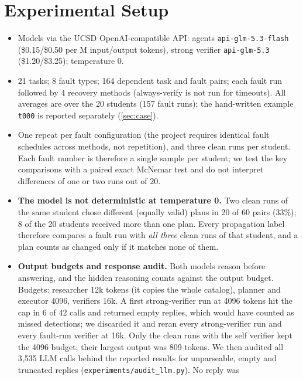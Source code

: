 \documentclass[11pt]{article}
\newcommand{\code}[1]{\texttt{\small #1}}
\begin{document}
\section{Experimental Setup}
\label{sec:setup}
\begin{itemize}[leftmargin=*,itemsep=1pt]
  \item Models via the UCSD OpenAI-compatible API: agents
        \code{api-glm-5.3-flash} (\$0.15/\$0.50 per M input/output tokens),
        strong verifier \code{api-glm-5.3} (\$1.20/\$3.25); temperature 0.
  \item 21 tasks; 8 fault types; 164 dependent task and fault pairs; each fault
        run followed by 4 recovery methods (always-verify is not run for
        timeouts). All averages are over the 20 students (157 fault runs);
        the hand-written example \code{t000} is reported separately
        (\cref{sec:case}).
  \item One repeat per fault configuration (the project requires identical
        fault schedules across methods, not repetition), and three clean runs
        per student. Each fault number is therefore a single sample per
        student; we test the key comparisons with a paired exact McNemar test
        and do not interpret differences of one or two runs out of 20.
  \item \textbf{The model is not deterministic at temperature 0.} Two clean
        runs of the same student chose different (equally valid) plans in 20
        of 60 pairs (33\%); 8 of the 20 students received more than one plan.
        Every propagation label therefore compares a fault run with
        \emph{all three} clean runs of that student, and a plan counts as
        changed only if it matches none of them.
  \item \textbf{Output budgets and response audit.} Both models reason
        before answering, and the hidden reasoning counts against the output
        budget. Budgets: researcher 12k tokens (it copies the whole catalog),
        planner and executor 4096, verifiers 16k. A first strong-verifier run
        at 4096 tokens hit the cap in 6 of 42 calls and returned empty
        replies, which would have counted as missed detections; we discarded
        it and reran every strong-verifier run and every fault-run verifier at
        16k. Only the clean runs with the self verifier kept the 4096 budget;
        their largest output was 809 tokens. We then audited all 3,535 LLM
        calls behind the reported results for unparseable, empty and
        truncated replies (\code{experiments/audit\_llm.py}). No reply was

\end{itemize}
\end{document}
